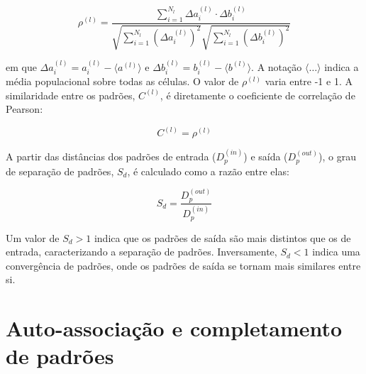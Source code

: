 \begin{equation}
    \label{eq:pearson}
    \rho^{(l)} = \frac{\sum_{i=1}^{N_l} \Delta a_i^{(l)} \cdot \Delta b_i^{(l)}}{\sqrt{\sum_{i=1}^{N_l} (\Delta a_i^{(l)})^2} \sqrt{\sum_{i=1}^{N_l} (\Delta b_i^{(l)})^2}}
\end{equation}

em que $\Delta a_i^{(l)} = a_i^{(l)} - \langle a^{(l)} \rangle$ e $\Delta b_i^{(l)} = b_i^{(l)} - \langle b^{(l)} \rangle$. A notação $\langle \dots \rangle$ indica a média populacional sobre todas as células. O valor de $\rho^{(l)}$ varia entre -1 e 1.
A similaridade entre os padrões, $C^{(l)}$, é diretamente o coeficiente de correlação de Pearson:

\begin{equation}
    \label{eq:c}
    C^{(l)} = \rho^{(l)}
\end{equation}

A partir das distâncias dos padrões de entrada ($D_p^{(in)}$) e saída ($D_p^{(out)}$), o grau de separação de padrões, $S_d$, é calculado como a razão entre elas:

\begin{equation}
    \label{eq:sd}
    S_d = \frac{D_p^{(out)}}{D_p^{(in)}}
\end{equation}

Um valor de $S_d > 1$ indica que os padrões de saída são mais distintos que os de entrada, caracterizando a separação de padrões. Inversamente, $S_d < 1$ indica uma convergência de padrões, onde os padrões de saída se tornam mais similares entre si.

\section{Auto-associação e completamento de padrões}


